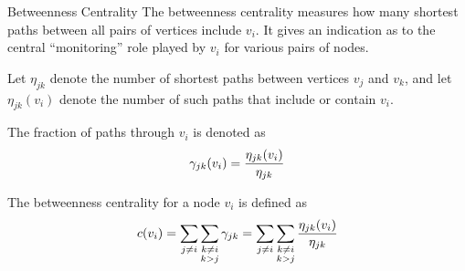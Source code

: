 \begin{frame}{Betweenness Centrality}
The betweenness centrality measures how
many shortest paths between all pairs of vertices include $v_i$.
It gives an indication as to the central ``monitoring'' role
played by $v_i$ for various pairs of nodes.

\medskip
Let $\eta_{jk}$
denote the number of shortest paths between vertices $v_{j}$
 and $v_k$, and let $\eta_{jk}(v_i)$ denote the number of such
 paths that include or contain $v_i$. 
 
\medskip
 The fraction of
 paths through $v_i$ is denoted as
 \begin{align*}
     \gamma_{jk}(v_i) = {\eta_{jk}(v_i) \over \eta_{jk}}
 \end{align*}

\medskip
 The betweenness centrality for a node $v_i$ is def\/{i}ned as
 \begin{align*}
     c(v_i) = \sum_{j \ne i} \sum_{\substack{k \ne i\\k>j}} \gamma_{jk}
     = \sum_{j \ne i} \sum_{\substack{k \ne i\\k>j}} {\eta_{jk}(v_i) \over \eta_{jk}}
 \end{align*}

 \end{frame}

 
 
